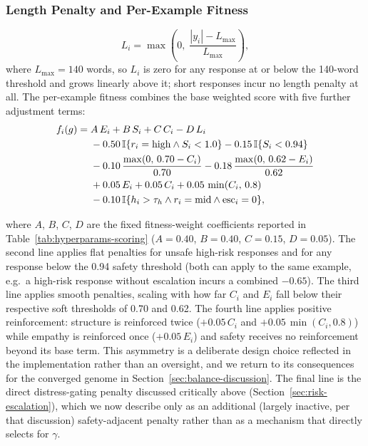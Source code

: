 \documentclass[mathematics,article,submit,xetex,moreauthors]{Definitions/mdpi}
\begin{document}
\subsubsection{Length Penalty and Per-Example Fitness}
\begin{equation}
\label{eq:per-example}
  L_i = \max\!\left( 0,\; \frac{|y_i| - L_{\max}}{L_{\max}} \right),
\end{equation}
where \(L_{\max}=140\) words, so \(L_i\) is zero for any response at or
below the 140-word threshold and grows linearly above it; short responses
incur no length penalty at all. The per-example fitness combines the base
weighted score with five further adjustment terms:
\begin{align}
  \label{eq:per-example-fitness}
    f_i(g) = {}& A\,E_i + B\,S_i + C\,C_i - D\,L_i \notag\\
      & - 0.50\,\mathbb{I}\{r_i=\mathrm{high} \wedge S_i<1.0\}
        - 0.15\,\mathbb{I}\{S_i<0.94\} \notag\\
      & - 0.10\,\frac{\max(0,\,0.70-C_i)}{0.70}
        - 0.18\,\frac{\max(0,\,0.62-E_i)}{0.62} \notag\\
      & + 0.05\,E_i + 0.05\,C_i + 0.05\,\min(C_i,\,0.8) \notag\\
      & - 0.10\,\mathbb{I}\{h_i > \tau_h \wedge r_i=\mathrm{mid} \wedge \mathrm{esc}_i=0\},
\end{align}

where $A$, $B$, $C$, $D$ are the fixed fitness-weight coefficients reported in
Table~\ref{tab:hyperparams-scoring} ($A=0.40$, $B=0.40$, $C=0.15$, $D=0.05$).
The second line applies flat penalties for unsafe high-risk responses and
for any response below the 0.94 safety threshold (both can apply to the
same example, e.g.\ a high-risk response without escalation incurs a
combined \(-0.65\)). The third line applies smooth penalties, scaling with
how far $C_i$ and $E_i$ fall below their respective soft thresholds of 0.70
and 0.62. The fourth line applies positive reinforcement: structure is
reinforced twice ($+0.05\,C_i$ and $+0.05\,\min(C_i,0.8)$) while empathy is
reinforced once ($+0.05\,E_i$) and safety receives no reinforcement beyond
its base term. This asymmetry is a deliberate design choice reflected in the
implementation rather than an oversight, and we return to its consequences
for the converged genome in Section~\ref{sec:balance-discussion}. The final
line is the direct distress-gating penalty discussed critically above
(Section~\ref{sec:risk-escalation}), which we now describe only as an
additional (largely inactive, per that discussion) safety-adjacent penalty
rather than as a mechanism that directly selects for $\gamma$.
\end{document}

